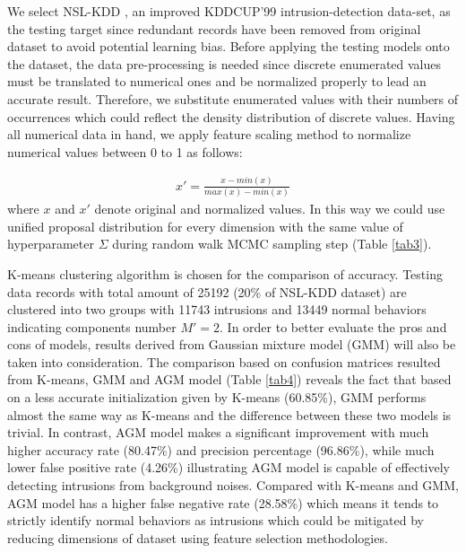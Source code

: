 \documentclass[conference]{llncs}
\begin{document}
We select NSL-KDD \cite{Tavallaee2009}, an improved KDDCUP'99 intrusion-detection data-set, as the testing target since redundant records have been removed from original dataset to avoid potential learning bias. Before applying the testing models onto the dataset, the data pre-processing is needed since discrete enumerated values must be translated to numerical ones and be normalized properly to lead an accurate result. Therefore, we substitute enumerated values with their numbers of occurrences which could reflect the density distribution of discrete values. Having all numerical data in hand, we apply feature scaling method to normalize numerical values between 0 to 1 as follows:

\begin{align}
x' = \frac{x - min(x)}{max(x) - min(x)}
\label{eq:13}
\end{align}
where $x$ and $x'$ denote original and normalized values. In this way we could use unified proposal distribution for every dimension with the same value of hyperparameter $\Sigma$ during random walk MCMC sampling step (Table \ref{tab3}).

K-means clustering algorithm \cite{Hartigan1979} is chosen for the comparison of accuracy. Testing data records with total amount of 25192 (20\% of NSL-KDD dataset) are clustered into two groups with 11743 intrusions and 13449 normal behaviors indicating components number $M' = 2$. In order to better evaluate the pros and cons of models, results derived from Gaussian mixture model (GMM) will also be taken into consideration. The comparison based on confusion matrices resulted from K-means, GMM and AGM model (Table \ref{tab4}) reveals the fact that based on a less accurate initialization given by K-means (60.85\%), GMM performs almost the same way as K-means and the difference between these two models is trivial. In contrast, AGM model makes a significant improvement with much higher accuracy rate (80.47\%) and precision percentage (96.86\%), while much lower false positive rate (4.26\%) illustrating AGM model is capable of effectively detecting intrusions from background noises. Compared with K-means and GMM, AGM model has a higher false negative rate (28.58\%) which means it tends to strictly identify normal behaviors as intrusions which could be mitigated by reducing dimensions of dataset using feature selection methodologies.
\end{document}
